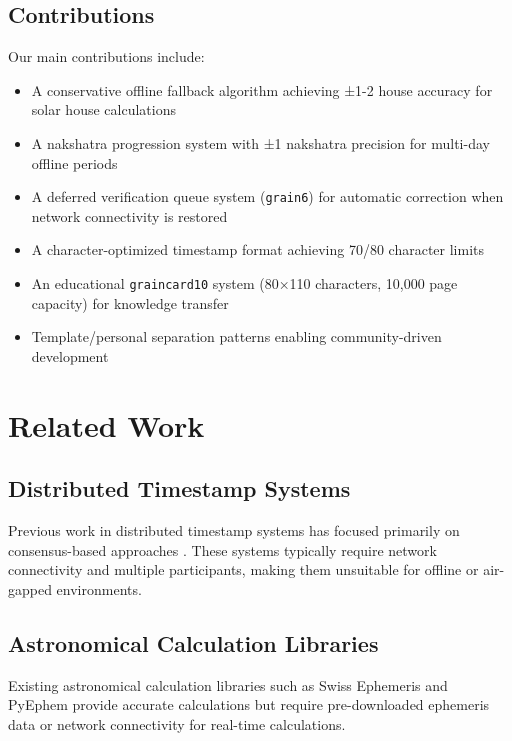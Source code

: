 \documentclass[11pt]{article}
\newcommand{\graincard}{\texttt{graincard10}}
\begin{document}
\subsection{Contributions}

Our main contributions include:

\begin{itemize}
    \item A conservative offline fallback algorithm achieving ±1-2 house accuracy for solar house calculations
    \item A nakshatra progression system with ±1 nakshatra precision for multi-day offline periods
    \item A deferred verification queue system (\texttt{grain6}) for automatic correction when network connectivity is restored
    \item A character-optimized timestamp format achieving 70/80 character limits
    \item An educational \graincard{} system (80×110 characters, 10,000 page capacity) for knowledge transfer
    \item Template/personal separation patterns enabling community-driven development
\end{itemize}

\section{Related Work}

\subsection{Distributed Timestamp Systems}

Previous work in distributed timestamp systems has focused primarily on consensus-based approaches \cite{lamport1978time, schneider1990implementing}. These systems typically require network connectivity and multiple participants, making them unsuitable for offline or air-gapped environments.

\subsection{Astronomical Calculation Libraries}

Existing astronomical calculation libraries such as Swiss Ephemeris \cite{swisseph} and PyEphem \cite{pyephem} provide accurate calculations but require pre-downloaded ephemeris data or network connectivity for real-time calculations.
\end{document}
